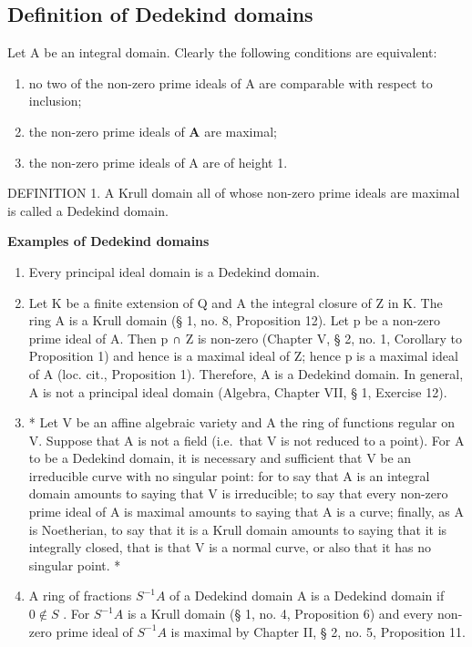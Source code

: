 \subsection{Definition of Dedekind domains}

Let A be an integral domain. Clearly the following conditions are equivalent:

\begin{enumerate}
\def\labelenumi{(\alph{enumi})}
\item
  no two of the non-zero prime ideals of A are comparable with respect to inclusion;
\item
  the non-zero prime ideals of \(\mathbf{A}\) are maximal;
\item
  the non-zero prime ideals of A are of height 1.
\end{enumerate}

DEFINITION 1. A Krull domain all of whose non-zero prime ideals are maximal is called a Dedekind domain.

\textbf{Examples of Dedekind domains}\par

\begin{enumerate}
\def\labelenumi{(\arabic{enumi})}
\item
  Every principal ideal domain is a Dedekind domain.
\item
  Let K be a finite extension of Q and A the integral closure of Z in K. The ring A is a Krull domain (§ 1, no. 8, Proposition 12). Let p be a non-zero prime ideal of A. Then p ∩ Z is non-zero (Chapter V, § 2, no. 1, Corollary to Proposition 1) and hence is a maximal ideal of Z; hence p is a maximal ideal of A (loc. cit., Proposition 1). Therefore, A is a Dedekind domain. In general, A is not a principal ideal domain (Algebra, Chapter VII, § 1, Exercise 12).
\item
  * Let V be an affine algebraic variety and A the ring of functions regular on V. Suppose that A is not a field (i.e.~that V is not reduced to a point). For A to be a Dedekind domain, it is necessary and sufficient that V be an irreducible curve with no singular point: for to say that A is an integral domain amounts to saying that V is irreducible; to say that every non-zero prime ideal of A is maximal amounts to saying that A is a curve; finally, as A is Noetherian, to say that it is a Krull domain amounts to saying that it is integrally closed, that is that V is a normal curve, or also that it has no singular point. *
\item
  A ring of fractions \(S^{-1}A\) of a Dedekind domain A is a Dedekind domain if \(0 \notin S\) . For \(S^{-1}A\) is a Krull domain (§ 1, no. 4, Proposition 6) and every non-zero prime ideal of \(S^{-1}A\) is maximal by Chapter II, § 2, no. 5, Proposition 11.
\end{enumerate}


